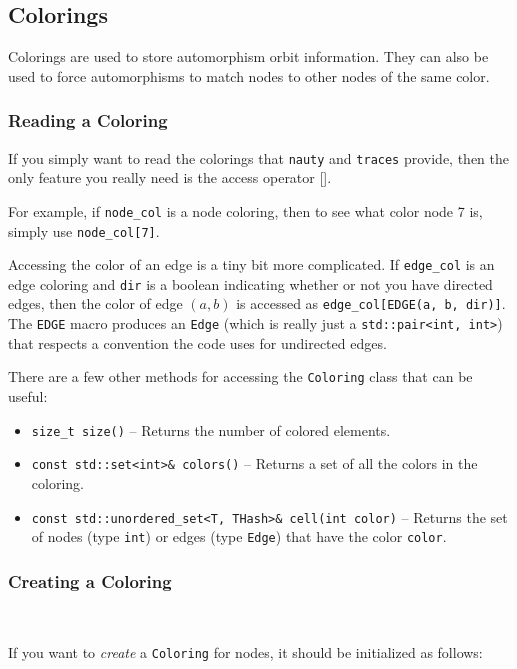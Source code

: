 \documentclass{article}
\begin{document}
\subsection{Colorings}\label{sec:coloring}

Colorings are used to store automorphism orbit information. They can also be used to force automorphisms to match nodes to other nodes of the same color.

\subsubsection{Reading a Coloring}

If you simply want to read the colorings that \verb|nauty| and \verb|traces| provide, then the only feature you really need is the access operator [].

For example, if \verb|node_col| is a node coloring, then to see what color node 7 is, simply use \verb|node_col[7]|.

Accessing the color of an edge is a tiny bit more complicated. If \verb|edge_col| is an edge coloring and \verb|dir| is a boolean indicating whether or not you have directed edges, then the color of edge $(a, b)$ is accessed as \verb|edge_col[EDGE(a, b, dir)]|. The \verb|EDGE| macro produces an \verb|Edge| (which is really just a \verb|std::pair<int, int>|) that respects a convention the code uses for undirected edges.

There are a few other methods for accessing the \verb|Coloring| class that can be useful:

\begin{itemize}
    \item \verb|size_t size()| -- Returns the number of colored elements.
    \item \verb|const std::set<int>& colors()| -- Returns a set of all the colors in the coloring.
    \item \verb|const std::unordered_set<T, THash>& cell(int color)| -- Returns the set of nodes (type \verb|int|) or edges (type \verb|Edge|) that have the color \verb|color|.
\end{itemize}


\subsubsection{Creating a Coloring} \ 

If you want to \emph{create} a \verb|Coloring| for nodes, it should be initialized as follows:
\end{document}
